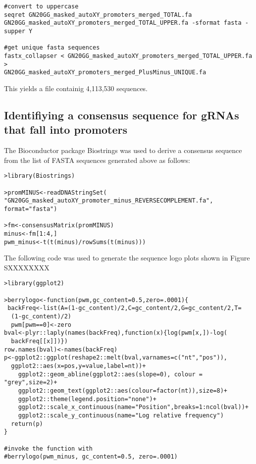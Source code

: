\begin{footnotesize}
\begin{lstlisting}
#convert to uppercase 
seqret GN20GG_masked_autoXY_promoters_merged_TOTAL.fa 
GN20GG_masked_autoXY_promoters_merged_TOTAL_UPPER.fa -sformat fasta -supper Y   

#get unique fasta sequences
fastx_collapser < GN20GG_masked_autoXY_promoters_merged_TOTAL_UPPER.fa >
GN20GG_masked_autoXY_promoters_merged_PlusMinus_UNIQUE.fa

\end{lstlisting}

This yields a file containig 4,113,530 sequences.

\subsection{Identifiying a consensus sequence for gRNAs that fall into promoters}

The Bioconductor package Biostrings\cite{Biostrings} was used to derive a consensus sequence from the list of FASTA sequences generated above as follows:

\begin{lstlisting}
>library(Biostrings)

>promMINUS<-readDNAStringSet(
"GN20GG_masked_autoXY_promoter_minus_REVERSECOMPLEMENT.fa", format="fasta")  

>fm<-consensusMatrix(promMINUS) 
minus<-fm[1:4,] 
pwm_minus<-t(t(minus)/rowSums(t(minus)))  

\end{lstlisting}

The following code  was used to generate the sequence logo plots \cite{Berry:2006hv} shown in Figure SXXXXXXXX

\begin{lstlisting}
>library(ggplot2) 

>berrylogo<-function(pwm,gc_content=0.5,zero=.0001){
 backFreq<-list(A=(1-gc_content)/2,C=gc_content/2,G=gc_content/2,T=
  (1-gc_content)/2)
  pwm[pwm==0]<-zero
bval<-plyr::laply(names(backFreq),function(x){log(pwm[x,])-log(
  backFreq[[x]])})
row.names(bval)<-names(backFreq)
p<-ggplot2::ggplot(reshape2::melt(bval,varnames=c("nt","pos")),
  ggplot2::aes(x=pos,y=value,label=nt))+
    ggplot2::geom_abline(ggplot2::aes(slope=0), colour = "grey",size=2)+
    ggplot2::geom_text(ggplot2::aes(colour=factor(nt)),size=8)+
    ggplot2::theme(legend.position="none")+
    ggplot2::scale_x_continuous(name="Position",breaks=1:ncol(bval))+
    ggplot2::scale_y_continuous(name="Log relative frequency")
  return(p)
}

#invoke the function with
#berrylogo(pwm_minus, gc_content=0.5, zero=.0001)
\end{lstlisting}


\end{footnotesize}

